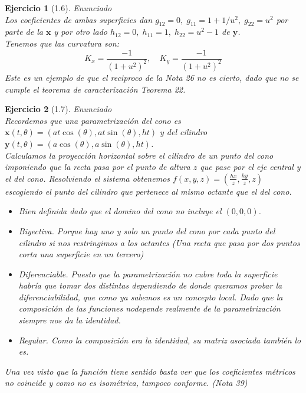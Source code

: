 \documentclass[a4paper,10pt]{article}
\newtheorem{ejercicio}{Ejercicio}[section]
\begin{document}
\begin{ejercicio}[1.6]
Enunciado\\

Los coeficientes de ambas superficies dan $g_{12}=0,\;g_{11}=1+1/u^2,\;g_{22}=u^2$ por parte de la $\mathbf{x}$ y por otro lado $h_{12}=0,\;h_{11}=1,\;h_{22}=u^2-1$ de $\mathbf{y}$.\\
Tenemos que las curvatura son:
\[
K_x=\frac{-1}{(1+u^2)^2},\quad K_y=\frac{-1}{(1+u^2)^2}
\]
Este es un ejemplo de que el reciproco de la Nota 26 no es cierto, dado que no se cumple el teorema de caracterización Teorema 22.
\end{ejercicio}

\begin{ejercicio}[1.7]
Enunciado\\

Recordemos que una parametrización del cono es $\mathbf{x}(t,\theta)=(at\cos(\theta),at\sin(\theta),ht)$ y del cilindro $\mathbf{y}(t,\theta)=(a\cos(\theta),a\sin(\theta),ht)$.\\

Calculamos la proyección horizontal sobre el cilindro de un punto del cono imponiendo que la recta pasa por el punto de altura $z$ que pase por el eje central y el del cono. Resolviendo el sistema obtenemos $f(x,y,z)=(\frac{hx}{z},\frac{hy}{z},z)$ escogiendo el punto del cilindro que pertenece al mismo octante que el del cono.
\begin{itemize}
	\item Bien definida dado que el domino del cono no incluye el $(0,0,0)$.
	\item Biyectiva. Porque hay uno y solo un punto del cono por cada punto del cilindro si nos restringimos a los octantes (Una recta que pasa por dos puntos corta  una superficie en un tercero)
	\item Diferenciable. Puesto que la parametrización no cubre toda la superficie habría que tomar dos distintas dependiendo de donde queramos probar la diferenciabilidad, que como ya sabemos es un concepto local. Dado que la composición de las funciones nodepende realmente de la parametrización siempre nos da la identidad.
	\item Regular. Como la composición era la identidad, su matriz asociada también lo es. 
\end{itemize}
Una vez visto que la función tiene sentido basta ver que los coeficientes métricos no coincide y como no es isométrica, tampoco conforme. (Nota 39)
\end{ejercicio}
\end{document}
